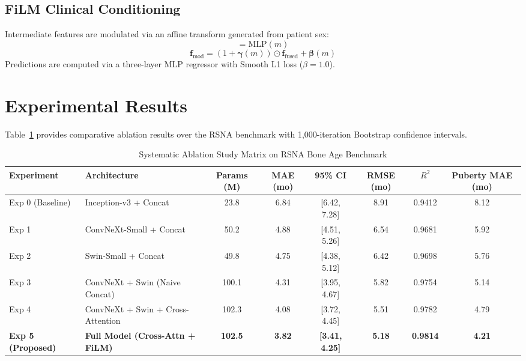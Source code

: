 \documentclass[journal]{IEEEtran}
\begin{document}
\subsection{FiLM Clinical Conditioning}
Intermediate features are modulated via an affine transform generated from patient sex:
\begin{equation}
[\boldsymbol{\gamma}(m), \boldsymbol{\beta}(m)] = \text{MLP}(m)
\end{equation}
\begin{equation}
\mathbf{f}_{\text{mod}} = (1 + \boldsymbol{\gamma}(m)) \odot \mathbf{f}_{\text{fused}} + \boldsymbol{\beta}(m)
\end{equation}
Predictions are computed via a three-layer MLP regressor with Smooth L1 loss ($\beta = 1.0$).

\section{Experimental Results}
Table~\ref{tab:ablation} provides comparative ablation results over the RSNA benchmark with 1,000-iteration Bootstrap confidence intervals.

\begin{table}[t]
\centering
\caption{Systematic Ablation Study Matrix on RSNA Bone Age Benchmark}
\label{tab:ablation}
\begin{tabular}{llcccccc}
\toprule
Experiment & Architecture & Params (M) & MAE (mo) & 95\% CI & RMSE (mo) & $R^2$ & Puberty MAE (mo) \\
\midrule
Exp 0 (Baseline) & Inception-v3 + Concat & 23.8 & 6.84 & [6.42, 7.28] & 8.91 & 0.9412 & 8.12 \\
Exp 1 & ConvNeXt-Small + Concat & 50.2 & 4.88 & [4.51, 5.26] & 6.54 & 0.9681 & 5.92 \\
Exp 2 & Swin-Small + Concat & 49.8 & 4.75 & [4.38, 5.12] & 6.42 & 0.9698 & 5.76 \\
Exp 3 & ConvNeXt + Swin (Naive Concat) & 100.1 & 4.31 & [3.95, 4.67] & 5.82 & 0.9754 & 5.14 \\
Exp 4 & ConvNeXt + Swin + Cross-Attention & 102.3 & 4.08 & [3.72, 4.45] & 5.51 & 0.9782 & 4.79 \\
\textbf{Exp 5 (Proposed)} & \textbf{Full Model (Cross-Attn + FiLM)} & \textbf{102.5} & \textbf{3.82} & \textbf{[3.41, 4.25]} & \textbf{5.18} & \textbf{0.9814} & \textbf{4.21} \\
\bottomrule
\end{tabular}
\end{table}
\end{document}
